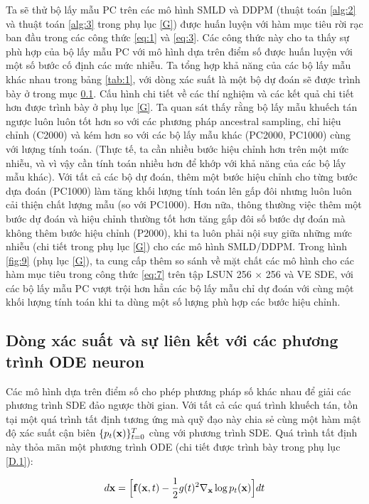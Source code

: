 \documentclass{article} %
\begin{document}
Ta sẽ thử bộ lấy mẫu PC trên các mô hình SMLD và DDPM (thuật toán \ref{alg:2} và thuật toán \ref{alg:3} trong phụ lục \ref{G}) được huấn luyện với hàm mục tiêu rời rạc ban đầu trong các công thức \ref{eq:1} và \ref{eq:3}.
Các công thức này cho ta thấy sự phù hợp của bộ lấy mẫu PC với mô hình dựa trên điểm số được huấn luyện với một số bước cố định các mức nhiễu.
Ta tổng hợp khả năng của các bộ lấy mẫu khác nhau trong bảng \ref{tab:1}, với dòng xác suất là một bộ dự đoán sẽ được trình bày ở trong mục \ref{4.3}.
Cấu hình chi tiết về các thí nghiệm và các kết quả chi tiết hơn được trình bày ở phụ lục \ref{G}.
Ta quan sát thấy rằng bộ lấy mẫu khuếch tán ngược luôn luôn tốt hơn so với các phương pháp ancestral sampling, chỉ hiệu chỉnh (C2000) và kém hơn so với các bộ lấy mẫu khác (PC2000, PC1000) cùng với lượng tính toán.
(Thực tế, ta cần nhiều bước hiệu chỉnh hơn trên một mức nhiễu, và vì vậy cần tính toán nhiều hơn để khớp với khả năng của các bộ lấy mẫu khác).
Với tất cả các bộ dự đoán, thêm một bước hiệu chỉnh cho từng bước dựa đoán (PC1000) làm tăng khối lượng tính toán lên gấp đôi nhưng luôn luôn cải thiện chất lượng mẫu (so với PC1000).
Hơn nữa, thông thường việc thêm một bước dự đoán và hiệu chỉnh thường tốt hơn tăng gấp đôi số bước dự đoán mà không thêm bước hiệu chỉnh (P2000),
khi ta luôn phải nội suy giữa những mức nhiễu (chi tiết trong phụ lục \ref{G}) cho các mô hình SMLD/DDPM.
Trong hình \ref{fig:9} (phụ lục \ref{G}), ta cung cấp thêm so sánh về mặt chất các mô hình cho các hàm mục tiêu trong công thức \ref{eq:7} trên tập LSUN 256 $\times$ 256 và VE SDE, với các bộ lấy mẫu PC vượt trội hơn hẳn các bộ lấy mẫu chỉ dự đoán với cùng một khối lượng tính toán khi ta dùng một số lượng phù hợp các bước hiệu chỉnh.

\subsection{Dòng xác suất và sự liên kết với các phương trình ODE neuron} \label{4.3}

Các mô hình dựa trên điểm số cho phép phương pháp số khác nhau để giải các phương trình SDE đảo ngược thời gian.
Với tất cả các quá trình khuếch tán, tồn tại một quá trình tất định tương ứng mà quỹ đạo này chia sẻ cùng một hàm mật độ xác suất cận biên $\lbrace p_t (\bold{x}) \rbrace_{t=0}^T$ cùng với phương trình SDE.
Quá trình tất định này thỏa mãn một phương trình ODE (chi tiết được trình bày trong phụ lục \ref{D.1}):

\begin{equation} \label{eq:13}
    d \bold{x} = \Big \lbrack \bold{f}(\bold{x}, t) - \dfrac{1}{2}g(t)^2 \nabla_{\bold{x}} \log p_t (\bold{x}) \Big \rbrack dt
\end{equation}
\end{document}
